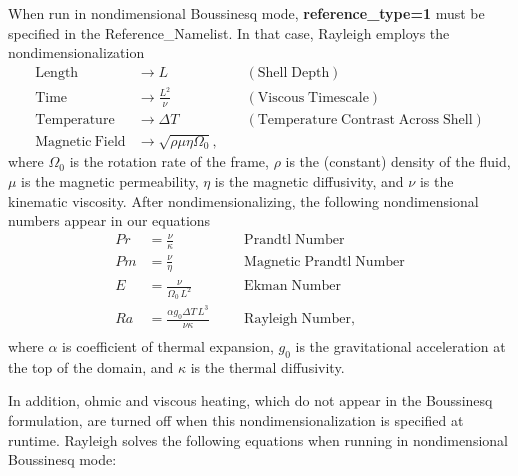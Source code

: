When run in nondimensional Boussinesq mode, \textbf{reference\_type=1} must be specified in the Reference\_Namelist.  In that case, Rayleigh employs the nondimensionalization
\begin{align*}
\mathrm{Length} &\rightarrow L &\;\;\;\; \mathrm{(Shell\; Depth)} \\
\mathrm{Time} &\rightarrow   \frac{L^2}{\nu} &\;\;\;\; \mathrm{(Viscous\; Timescale)}\\
\mathrm{Temperature} &\rightarrow \Delta T&\;\;\;\; \mathrm{(Temperature\; Contrast\; Across\; Shell)} \\
\mathrm{Magnetic~Field} &\rightarrow \sqrt{\rho\mu\eta\Omega_0},
\end{align*}
where $\Omega_0$ is the rotation rate of the frame, $\rho$ is the (constant) density of the fluid, $\mu$ is the magnetic permeability, $\eta$ is the magnetic diffusivity, and $\nu$ is the kinematic viscosity.  After nondimensionalizing, the following nondimensional numbers appear in our equations
\begin{align*}
Pr &=\frac{\nu}{\kappa}                          &\;\;\;\;\;\; \mathrm{Prandtl\; Number} \\
Pm &=\frac{\nu}{\eta}                            &\;\;\;\;\;\; \mathrm{Magnetic\; Prandtl\; Number} \\
E  &=\frac{\nu}{\Omega_0\,L^2}                   &\;\;\;\;\;\; \mathrm{Ekman\; Number} \\
Ra &=\frac{\alpha g_0 \Delta T\,L^3}{\nu\kappa}  &\;\;\;\;\;\; \mathrm{Rayleigh\; Number}, \\
\end{align*}
where $\alpha$ is coefficient of thermal expansion, $g_0$ is the gravitational acceleration at the top of the domain, and $\kappa$ is the thermal diffusivity.

 In addition, ohmic and viscous heating, which do not appear in the Boussinesq formulation, are turned off when this nondimensionalization is specified at runtime.   Rayleigh solves the following equations when running in nondimensional Boussinesq mode:


